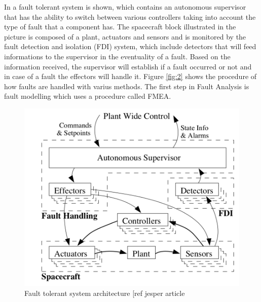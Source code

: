In  a fault tolerant system is shown, which contains an autonomous supervisor that has the ability to switch between various controllers taking into account the type of fault that a component has. The spacecraft block illustrated in the picture is composed of a plant, actuators and sensors and is monitored by the fault detection and isolation  (FDI) system, which include detectors that will feed informations to the supervisor in the eventuality of a fault. Based on the information received, the supervisor will establish if a fault occurred or not and in case of a fault the effectors will handle it. Figure \ref{fig:2} shows the procedure of how faults are handled with varius methods. The first step in Fault Analysis is fault modelling which uses a procedure called FMEA.
\begin{table}[H]
	\begin{minipage}[b]{0.49\linewidth}
		\centering
		\begin{figure}[H]
			\centering
			\includegraphics[width=1\linewidth]{figures/FTC}
			\caption{Fault tolerant system architecture [ref jesper article}
			\label{fig:1}
		\end{figure}
	\end{minipage}\hfill
	\begin{minipage}[b]{0.49\linewidth}
		\centering
		\begin{figure}[H]
			\centering

\end{figure}
\end{minipage}
\end{table}
